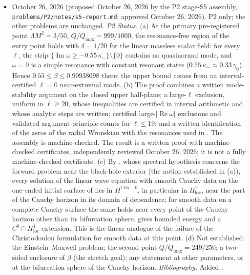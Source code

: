 \documentclass[11pt,letterpaper]{article}
\begin{document}
\begin{itemize}[leftmargin=2.6em,itemsep=1pt,topsep=2pt]
\item[v1.3] October 26, 2026 (proposed October 26, 2026 by the P2 stage-S5 assembly, \texttt{problems/\allowbreak P2/\allowbreak notes/\allowbreak s5-report.md}; approved October 26, 2026). P2 only; the other problems are unchanged. \emph{P2 Status.} (a) At the primary pre-registered point $\Lambda M^2=3/50$, $Q/Q_{\max}=999/1000$, the resonance-free region of the entry point holds with $\delta=1/20$ for the linear massless scalar field: for every $\ell$, the strip $\{\operatorname{Im}\omega\ge-0.55\,\kappa_-\}\setminus\{0\}$ contains no quasinormal mode, and $\omega=0$ is a simple resonance with constant resonant states ($0.55\,\kappa_-\approx0.33\,\gamma_0$). Hence $0.55\le\beta\le0.90938098$ there; the upper bound comes from an interval-certified $\ell=0$ near-extremal mode. (b) The proof combines a written mode-stability argument on the closed upper half-plane; a large-$\ell$ exclusion, uniform in $\ell\ge20$, whose inequalities are certified in interval arithmetic and whose analytic steps are written; certified large-$|\operatorname{Re}\omega|$ exclusions and validated argument-principle counts for $\ell\le19$; and a written identification of the zeros of the radial Wronskian with the resonances used in \cite{hintzvasy2017}. The assembly is machine-checked. The result is a written proof with machine-checked certificates, independently reviewed October 26, 2026; it is not a fully machine-checked certificate. (c) By \cite[Thm.~1.1 and \S\S2.5--2.6]{hintzvasy2017}, whose spectral hypothesis concerns the forward problem near the black-hole exterior (the notion established in (a)), every solution of the linear wave equation with smooth Cauchy data on the one-ended initial surface of \cite{hintzvasy2017} lies in $H^{1.05-0}$, in particular in $H^1_{\mathrm{loc}}$, near the part of the Cauchy horizon in its domain of dependence; for smooth data on a complete Cauchy surface the same holds near every point of the Cauchy horizon other than its bifurcation sphere. \cite[Thm.~3.1]{costafranzen2017} gives bounded energy and a $C^0\cap H^1_{\mathrm{loc}}$ extension. This is the linear analogue of the failure of the Christodoulou formulation for smooth data at this point. (d) Not established: the Einstein--Maxwell problem; the second point $Q/Q_{\max}=249/250$; a two-sided enclosure of $\beta$ (the stretch goal); any statement at other parameters, or at the bifurcation sphere of the Cauchy horizon. \emph{Bibliography.} Added \cite{costafranzen2017}.

\end{itemize}
\end{document}
